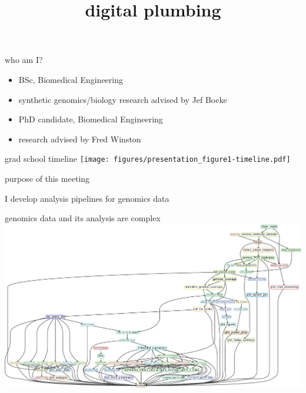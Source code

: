 \documentclass[aspectratio=169]{beamer}
\title{digital plumbing}
\begin{document}
\begin{frame}
    \titlepage
\end{frame}

\begin{frame}{who am I?}
    \begin{description}[align=right]
        \setlength{\itemsep}{1cm}
        \item[undergrad:]
            \begin{itemize}
                \item BSc, Biomedical Engineering
                \item synthetic genomics/biology research advised by Jef Boeke
            \end{itemize}
        \item[currently:]
            \begin{itemize}
                \item PhD candidate, Biomedical Engineering
                \item research advised by Fred Winston
            \end{itemize}
    \end{description}
\end{frame}

\begin{frame}{grad school timeline}
\texttt{[image: figures/presentation\_figure1-timeline.pdf]}
\end{frame}

\begin{frame}{purpose of this meeting}
\end{frame}

\begin{frame}{I develop analysis pipelines for genomics data}
\end{frame}

\begin{frame}{genomics data and its analysis are complex}
\includegraphics[width=\textwidth]{figures/rulegraph.pdf}
\end{frame}
\end{document}

